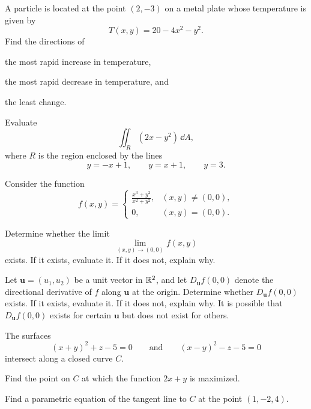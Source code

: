 
\begin{problem}
A particle is located at the point $(2,-3)$ on a metal plate whose temperature is given by
\[
T(x,y)=20-4x^2-y^2.
\]
Find the directions of
\begin{problemsubparts}
\item the most rapid increase in temperature,
\item the most rapid decrease in temperature, and
\item the least change.
\end{problemsubparts}
\end{problem}

\begin{problem}
Evaluate
\[
\iint_R (2x-y^2)\,\dd A,
\]
where $R$ is the region enclosed by the lines
\[
y=-x+1,
\qquad
y=x+1,
\qquad
y=3.
\]
\end{problem}

\begin{problem}
Consider the function
\[
f(x,y)=
\begin{cases}
\displaystyle\frac{x^3+y^2}{x^2+y^2}, & (x,y)\ne(0,0),\\[0.6em]
0, & (x,y)=(0,0).
\end{cases}
\]
\begin{problemsubparts}
\item Determine whether the limit
\[
\lim_{(x,y)\to(0,0)}f(x,y)
\]
exists. If it exists, evaluate it. If it does not, explain why.
\item Let $\mathbf u=(u_1,u_2)$ be a unit vector in $\mathbb{R}^2$, and let $D_{\mathbf u}f(0,0)$ denote the directional derivative of $f$ along $\mathbf u$ at the origin. Determine whether $D_{\mathbf u}f(0,0)$ exists. If it exists, evaluate it. If it does not, explain why. It is possible that $D_{\mathbf u}f(0,0)$ exists for certain $\mathbf u$ but does not exist for others.
\end{problemsubparts}
\end{problem}

\begin{problem}
The surfaces
\[
(x+y)^2+z-5=0
\qquad\text{and}\qquad
(x-y)^2-z-5=0
\]
intersect along a closed curve $C$.
\begin{problemsubparts}
\item Find the point on $C$ at which the function $2x+y$ is maximized.
\item Find a parametric equation of the tangent line to $C$ at the point $(1,-2,4)$.
\end{problemsubparts}
\end{problem}

